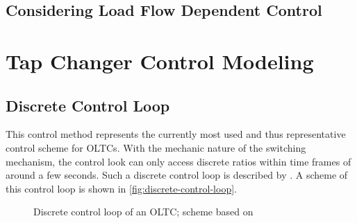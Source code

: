 
\subsection{Considering Load Flow Dependent Control}


\section{Tap Changer Control Modeling}


\subsection{Discrete Control Loop}
This control method represents the currently most used and thus representative control scheme for \acsp{OLTC}. With the mechanic nature of the switching mechanism, the control look can only access discrete ratios within time frames of around a few seconds. Such a discrete control loop is described by \textcite{milanoHybridControlModel2011,milanoPowerSystemModelling2010}. A scheme of this control loop is shown in \autoref{fig:discrete-control-loop}.

\begin{figure}[htb!]
        \centering
        \caption{Discrete control loop of an \acs{OLTC}; scheme based on \textcite{milanoHybridControlModel2011}}
        \label{fig:discrete-control-loop}
\end{figure}

